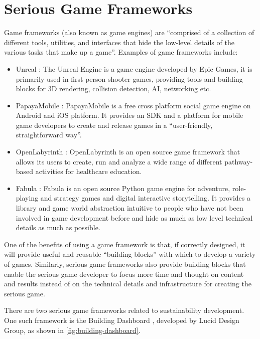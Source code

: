 \section{Serious Game Frameworks}
\label{sec:rel-sg-framework}

Game frameworks (also known as game engines) \cite{sherrod2006ultimate} are ``comprised of a collection of different tools, utilities, and interfaces that hide the low-level details of the various tasks that make up a game''. Examples of game frameworks include:
\begin {itemize}
    \item Unreal \cite{unrealengine}:  The Unreal Engine is a game engine developed by Epic Games, it is primarily used in first person shooter games, providing tools and building blocks for 3D rendering, collision detection, AI, networking etc.
    \item PapayaMobile \cite{papayamobile}: PapayaMobile is a free cross platform social game engine on Android and iOS platform. It provides an SDK and a platform for mobile game developers to create and release games in a ``user-friendly, straightforward way''.
    \item OpenLabyrinth \cite{openlabyrinth}: OpenLabyrinth is an open source game framework that allows its users to create, run and analyze a wide range of different pathway-based activities for healthcare education.
    \item Fabula \cite{fabula}: Fabula is an open source Python game engine for adventure, role-playing and strategy games and digital interactive storytelling. It provides a library and game world abstraction intuitive to people who have not been involved in game development before and hide as much as low level technical details as much as possible.
\end {itemize}

One of the benefits of using a game framework is that, if correctly designed, it will provide useful and reusable ``building blocks'' with which to develop a variety of games. Similarly, serious game frameworks also provide building blocks that enable the serious game developer to focus more time and thought on content and results instead of on the technical details and infrastructure for creating the serious game.

There are two serious game frameworks related to sustainability development. One such framework is the Building Dashboard \cite{building-dashboard}, developed by Lucid Design Group, as shown in \autoref{fig:building-dashboard}.

